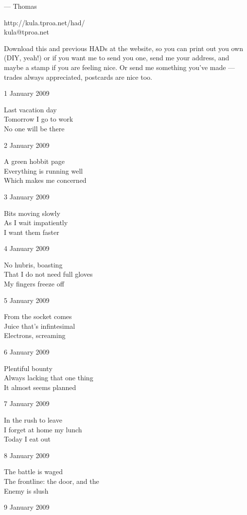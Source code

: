 \documentclass[12pt]{article}
\begin{document}
--- Thomas

http://kula.tproa.net/had/ \\
kula@tproa.net

Download this and previous HADs at the website, so you can
print out you own (DIY, yeah!) or if you want me to send
you one, send me your address, and maybe a stamp if you
are feeling nice. Or send me something you've made ---
trades always appreciated, postcards are nice too.


1 January 2009

Last vacation day \\
Tomorrow I go to work \\
No one will be there

2 January 2009

A green hobbit page \\
Everything is running well \\
Which makes me concerned

3 January 2009

Bits moving slowly \\
As I wait impatiently \\
I want them faster

\newpage

4 January 2009

No hubris, boasting \\
That I do not need full gloves \\
My fingers freeze off

5 January 2009

From the socket comes \\
Juice that's infintesimal \\
Electrons, screaming

6 January 2009

Plentiful bounty \\
Always lacking that one thing \\
It almost seems planned

7 January 2009

In the rush to leave \\
I forget at home my lunch \\
Today I eat out

8 January 2009

The battle is waged \\
The frontline: the door, and the \\
Enemy is slush

9 January 2009
\end{document}
